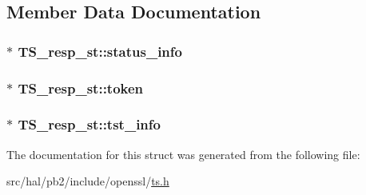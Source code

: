 \subsection{Member Data Documentation}
\subsubsection[{\texorpdfstring{status\+\_\+info}{status_info}}]{$\ast$ T\+S\+\_\+resp\+\_\+st\+::status\+\_\+info}\hypertarget{struct_t_s__resp__st_a9bd656baceb73a81e2cb3b41799c8dc0}{}\label{struct_t_s__resp__st_a9bd656baceb73a81e2cb3b41799c8dc0}
\subsubsection[{\texorpdfstring{token}{token}}]{$\ast$ T\+S\+\_\+resp\+\_\+st\+::token}\hypertarget{struct_t_s__resp__st_afaf455ead8fb6b4c236f8c6c28eb458d}{}\label{struct_t_s__resp__st_afaf455ead8fb6b4c236f8c6c28eb458d}
\subsubsection[{\texorpdfstring{tst\+\_\+info}{tst_info}}]{$\ast$ T\+S\+\_\+resp\+\_\+st\+::tst\+\_\+info}\hypertarget{struct_t_s__resp__st_a79930775dd736e54ec3b762292e654e6}{}\label{struct_t_s__resp__st_a79930775dd736e54ec3b762292e654e6}


The documentation for this struct was generated from the following file\+:\begin{DoxyCompactItemize}
\item 
src/hal/pb2/include/openssl/\hyperlink{ts_8h}{ts.\+h}\end{DoxyCompactItemize}
